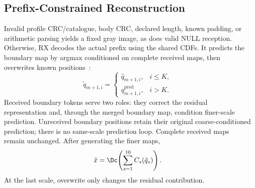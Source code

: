 \subsection{Prefix-Constrained Reconstruction}
Invalid profile CRC/catalogue, body CRC, declared length, known padding, or arithmetic parsing yields a fixed gray image, as does valid NULL reception. Otherwise, RX decodes the actual prefix using the shared CDFs. It predicts the boundary map by argmax conditioned on complete received maps, then overwrites known positions~\cite{var}:
\begin{equation}
\tilde q_{m+1,i}=\begin{cases}\hat q_{m+1,i},&i\leq K,\\q^{\mathrm{pred}}_{m+1,i},&i>K.\end{cases}
\label{eq:overwrite}
\end{equation}
Received boundary tokens serve two roles: they correct the residual representation and, through the merged boundary map, condition finer-scale prediction. Unreceived boundary positions retain their original coarse-conditioned prediction; there is no same-scale prediction loop. Complete received maps remain unchanged. After generating the finer maps,
\begin{equation}
\hat x=\Dc\!\left(\sum_{s=1}^{10}C_s(\tilde q_s)\right).
\label{eq:reconstruction}
\end{equation}
At the last scale, overwrite only changes the residual contribution.
